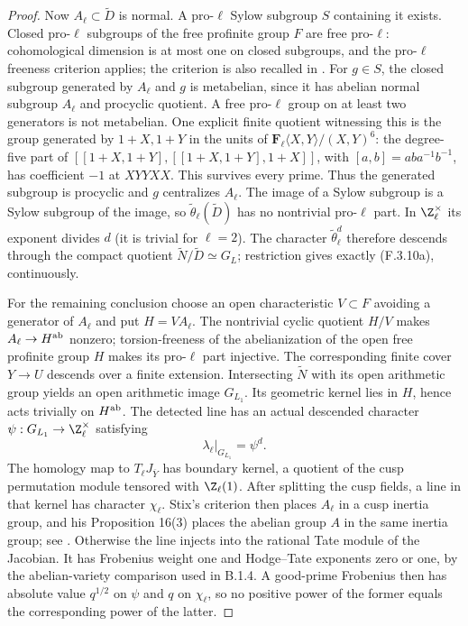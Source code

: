 \begin{proof}
Now $A_\ell\subset\widetilde D$ is normal. A pro-$\ell$
Sylow subgroup $S$ containing it exists. Closed pro-$\ell$
subgroups of the free profinite group $F$ are free pro-$\ell$:
cohomological dimension is at most one on closed subgroups,
and the pro-$\ell$ freeness criterion applies; the criterion
is also recalled in \cite[\S1.5, Lemma 1.7 and the proof of
Proposition 1.6]{AuditGille2000}. For $g\in S$, the closed
subgroup generated by $A_\ell$ and $g$ is metabelian, since
it has abelian normal subgroup $A_\ell$ and procyclic quotient.
A free pro-$\ell$ group on at least two generators is not
metabelian. One explicit finite quotient witnessing this is
the group generated by $1+X,1+Y$ in the units of
$\mathbf F_\ell\langle X,Y\rangle/(X,Y)^6$:
the degree-five part of
$[[1+X,1+Y],[[1+X,1+Y],1+X]]$, with $[a,b]=aba^{-1}b^{-1}$,
has coefficient $-1$
at $XYYXX$. This survives every prime. Thus the generated
subgroup is procyclic and $g$ centralizes $A_\ell$.
The image of a Sylow subgroup is a Sylow subgroup of the
image, so $\widetilde\theta_\ell(\widetilde D)$ has no
nontrivial pro-$\ell$ part. In $\Z_\ell^\times$ its exponent
divides $d$ (it is trivial for $\ell=2$). The character
$\widetilde\theta_\ell^d$ therefore descends through the
compact quotient $\widetilde N/\widetilde D\simeq G_L$;
restriction gives exactly (F.3.10a), continuously.

For the remaining conclusion choose an open characteristic
$V\subset F$ avoiding a generator of $A_\ell$ and put
$H=VA_\ell$. The nontrivial cyclic quotient $H/V$ makes
$A_\ell\to H^{\rm ab}$ nonzero; torsion-freeness of the
abelianization of the open free profinite group $H$ makes
its pro-$\ell$ part injective. The corresponding finite cover
$Y\to U$ descends over a finite extension. Intersecting
$\widetilde N$ with its open arithmetic group yields an
open arithmetic image $G_{L_1}$. Its geometric kernel lies
in $H$, hence acts trivially on $H^{\rm ab}$. The detected
line has an actual descended character
$\psi:G_{L_1}\to\Z_\ell^\times$ satisfying
\[
              \lambda_\ell|_{G_{L_1}}=\psi^d.
 \tag{F.3.10b}
\]
The homology map to $T_\ell J_{\overline Y}$ has boundary
kernel, a quotient of the cusp permutation module tensored
with $\Z_\ell(1)$. After splitting the cusp fields, a line
in that kernel has character $\chi_\ell$. Stix's criterion
then places $A_\ell$ in a cusp inertia group, and his
Proposition 16(3) places the abelian group $A$ in the same
inertia group; see \cite[Proposition 16, Definition 29 and
Theorem 30]{AuditStix2012}. Otherwise the line injects into
the rational Tate module of the Jacobian. It has Frobenius
weight one and Hodge--Tate exponents zero or one, by the
abelian-variety comparison used in B.1.4. A good-prime
Frobenius then has absolute value $q^{1/2}$ on $\psi$ and
$q$ on $\chi_\ell$, so no positive power of the former
equals the corresponding power of the latter.


\end{proof}
